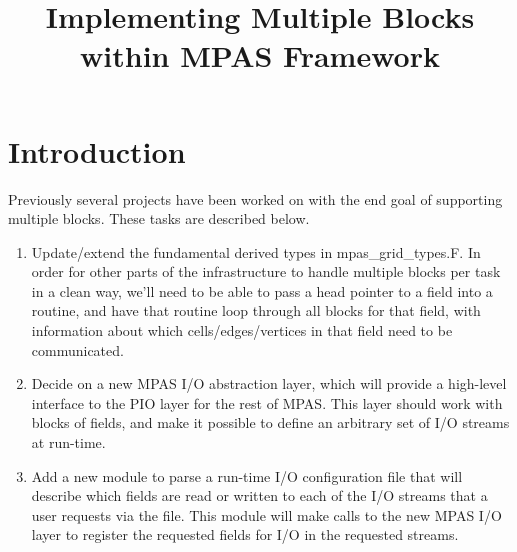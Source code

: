 \documentclass[11pt]{report}
\begin{document}
\title{Implementing Multiple Blocks within MPAS Framework}
\author{}

\maketitle
\tableofcontents


%
%
\chapter{Introduction}

Previously several projects have been worked on with the end goal of supporting
multiple blocks. These tasks are described below.

\begin{enumerate}

\item Update/extend the fundamental derived types in mpas\_grid\_types.F.                                
   In order for other parts of the infrastructure to handle multiple                                
   blocks per task in a clean way, we'll need to be able to pass a head                             
   pointer to a field into a routine, and have that routine loop through                            
   all blocks for that field, with information about which cells/edges/vertices                     
   in that field need to be communicated.                                                           
                                                                                                    
\item Decide on a new MPAS I/O abstraction layer, which will provide a                                
   high-level interface to the PIO layer for the rest of MPAS. This layer                           
   should work with blocks of fields, and make it possible to define an                             
   arbitrary set of I/O streams at run-time.                                                        
                                                                                                    
\item Add a new module to parse a run-time I/O configuration file that                                
   will describe which fields are read or written to each of the I/O                                
   streams that a user requests via the file. This module will make calls                           
   to the new MPAS I/O layer to register the requested fields for I/O in                            
   the requested streams.                                          
   

\end{enumerate}
\end{document}
